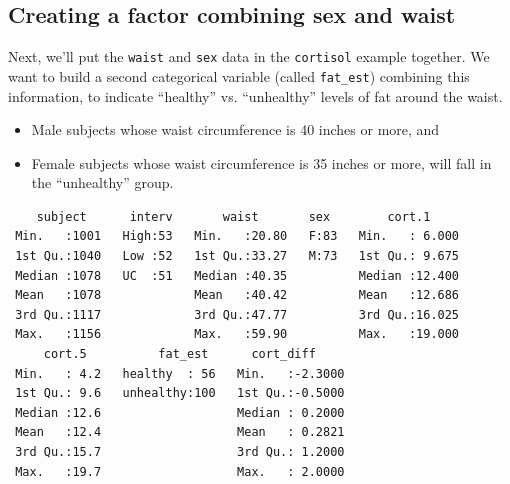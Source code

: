 \documentclass[]{book}
\newenvironment{Shaded}{\begin{snugshade}}{\end{snugshade}}
\newcommand{\KeywordTok}[1]{\textcolor[rgb]{0.13,0.29,0.53}{\textbf{#1}}}
\newcommand{\DataTypeTok}[1]{\textcolor[rgb]{0.13,0.29,0.53}{#1}}
\newcommand{\DecValTok}[1]{\textcolor[rgb]{0.00,0.00,0.81}{#1}}
\newcommand{\StringTok}[1]{\textcolor[rgb]{0.31,0.60,0.02}{#1}}
\newcommand{\OtherTok}[1]{\textcolor[rgb]{0.56,0.35,0.01}{#1}}
\newcommand{\OperatorTok}[1]{\textcolor[rgb]{0.81,0.36,0.00}{\textbf{#1}}}
\newcommand{\NormalTok}[1]{#1}
\providecommand{\tightlist}{%
  \setlength{\itemsep}{0pt}\setlength{\parskip}{0pt}}
\theoremstyle{definition}
\theoremstyle{definition}
\theoremstyle{definition}
\theoremstyle{remark}
\begin{document}
\subsection{Creating a factor combining sex and
waist}\label{creating-a-factor-combining-sex-and-waist}

Next, we'll put the \texttt{waist} and \texttt{sex} data in the
\texttt{cortisol} example together. We want to build a second
categorical variable (called \texttt{fat\_est}) combining this
information, to indicate ``healthy'' vs. ``unhealthy'' levels of fat
around the waist.

\begin{itemize}
\tightlist
\item
  Male subjects whose waist circumference is 40 inches or more, and
\item
  Female subjects whose waist circumference is 35 inches or more, will
  fall in the ``unhealthy'' group.
\end{itemize}

\begin{Shaded}
\end{Shaded}

\begin{verbatim}
    subject      interv       waist       sex        cort.1      
 Min.   :1001   High:53   Min.   :20.80   F:83   Min.   : 6.000  
 1st Qu.:1040   Low :52   1st Qu.:33.27   M:73   1st Qu.: 9.675  
 Median :1078   UC  :51   Median :40.35          Median :12.400  
 Mean   :1078             Mean   :40.42          Mean   :12.686  
 3rd Qu.:1117             3rd Qu.:47.77          3rd Qu.:16.025  
 Max.   :1156             Max.   :59.90          Max.   :19.000  
     cort.5          fat_est      cort_diff      
 Min.   : 4.2   healthy  : 56   Min.   :-2.3000  
 1st Qu.: 9.6   unhealthy:100   1st Qu.:-0.5000  
 Median :12.6                   Median : 0.2000  
 Mean   :12.4                   Mean   : 0.2821  
 3rd Qu.:15.7                   3rd Qu.: 1.2000  
 Max.   :19.7                   Max.   : 2.0000  
\end{verbatim}
\end{document}
